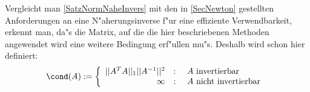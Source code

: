 Vergleicht man \ref{SatzNormNaheInvers} mit den in \ref{SecNewton} 
gestellten Anforderungen an eine N"aherungsinverse f"ur eine effiziente
Verwendbarkeit, erkennt man, da"s die Matrix, auf die die hier beschriebenen
Methoden angewendet wird eine weitere Bedingung erf"ullen mu"s. Deshalb 
wird schon hier definiert:
\[  
   \cond(A) := 
   \left\{
       \begin{array}{rcl}
            ||A^T A||_1 ||A^{-1}||^2  & : & 
                \mbox{ $A$ invertierbar } \\
            \infty & : & \mbox{ $A$ nicht invertierbar }
       \end{array}
   \right.
\]

